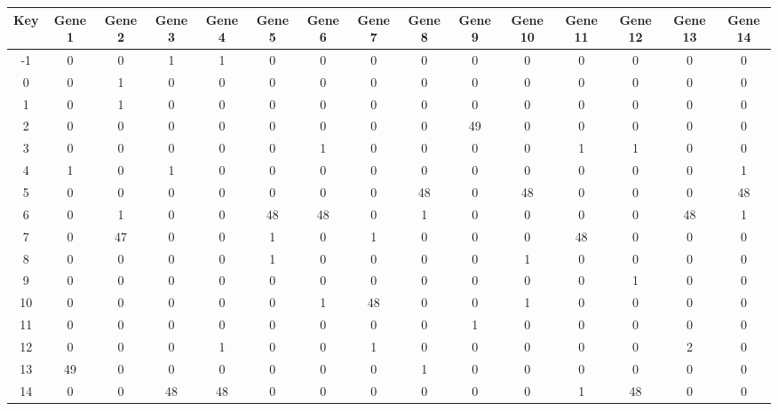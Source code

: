 \begin{tabular}{|c|c|c|c|c|c|c|c|c|c|c|c|c|c|c|}
\hline
Key & Gene 1 & Gene 2 & Gene 3 & Gene 4 & Gene 5 & Gene 6 & Gene 7 & Gene 8 & Gene 9 & Gene 10 & Gene 11 & Gene 12 & Gene 13 & Gene 14 \\
\hline
-1 & 0 & 0 & 1 & 1 & 0 & 0 & 0 & 0 & 0 & 0 & 0 & 0 & 0 & 0 \\
0 & 0 & 1 & 0 & 0 & 0 & 0 & 0 & 0 & 0 & 0 & 0 & 0 & 0 & 0 \\
1 & 0 & 1 & 0 & 0 & 0 & 0 & 0 & 0 & 0 & 0 & 0 & 0 & 0 & 0 \\
2 & 0 & 0 & 0 & 0 & 0 & 0 & 0 & 0 & 49 & 0 & 0 & 0 & 0 & 0 \\
3 & 0 & 0 & 0 & 0 & 0 & 1 & 0 & 0 & 0 & 0 & 1 & 1 & 0 & 0 \\
4 & 1 & 0 & 1 & 0 & 0 & 0 & 0 & 0 & 0 & 0 & 0 & 0 & 0 & 1 \\
5 & 0 & 0 & 0 & 0 & 0 & 0 & 0 & 48 & 0 & 48 & 0 & 0 & 0 & 48 \\
6 & 0 & 1 & 0 & 0 & 48 & 48 & 0 & 1 & 0 & 0 & 0 & 0 & 48 & 1 \\
7 & 0 & 47 & 0 & 0 & 1 & 0 & 1 & 0 & 0 & 0 & 48 & 0 & 0 & 0 \\
8 & 0 & 0 & 0 & 0 & 1 & 0 & 0 & 0 & 0 & 1 & 0 & 0 & 0 & 0 \\
9 & 0 & 0 & 0 & 0 & 0 & 0 & 0 & 0 & 0 & 0 & 0 & 1 & 0 & 0 \\
10 & 0 & 0 & 0 & 0 & 0 & 1 & 48 & 0 & 0 & 1 & 0 & 0 & 0 & 0 \\
11 & 0 & 0 & 0 & 0 & 0 & 0 & 0 & 0 & 1 & 0 & 0 & 0 & 0 & 0 \\
12 & 0 & 0 & 0 & 1 & 0 & 0 & 1 & 0 & 0 & 0 & 0 & 0 & 2 & 0 \\
13 & 49 & 0 & 0 & 0 & 0 & 0 & 0 & 1 & 0 & 0 & 0 & 0 & 0 & 0 \\
14 & 0 & 0 & 48 & 48 & 0 & 0 & 0 & 0 & 0 & 0 & 1 & 48 & 0 & 0 \\
\hline
\end{tabular}